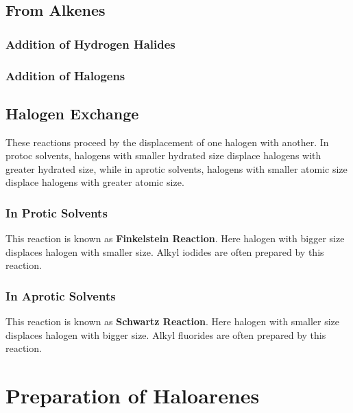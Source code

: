\documentclass{article}
\begin{document}
\subsection{From Alkenes}
\subsubsection{Addition of Hydrogen Halides}
\vspace{5mm}
\subsubsection{Addition of Halogens}
\vspace{5mm}
\subsection{Halogen Exchange}
These reactions proceed by the displacement of one halogen with another.
In protoc solvents, halogens with smaller hydrated size displace halogens with 
greater hydrated size, while in aprotic solvents, halogens with smaller atomic size
displace halogens with greater atomic size.
\subsubsection{In Protic Solvents}
\vspace{5mm}
\vspace{5mm}
This reaction is known as \textbf{Finkelstein Reaction}. Here halogen with 
bigger size displaces halogen with smaller size.
Alkyl iodides are often prepared by this reaction.
\subsubsection{In Aprotic Solvents}
\vspace{5mm}
\vspace{5mm}

This reaction is known as \textbf{Schwartz Reaction}. Here halogen with 
smaller size displaces halogen with bigger size. Alkyl fluorides are often 
prepared by this reaction.
\section{Preparation of Haloarenes}
\end{document}

